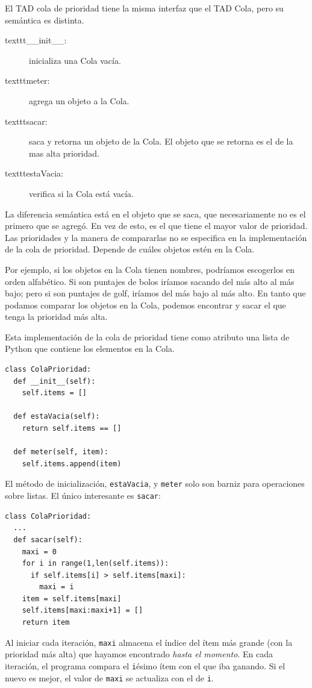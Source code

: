  

El TAD cola de prioridad tiene la misma interfaz que el TAD Cola,
pero su semántica es distinta.
\begin{description}
\item [{texttt{\_\_init\_\_}:}] inicializa una Cola vacía.
\item [{texttt{meter}:}] agrega un objeto a la Cola.
\item [{texttt{sacar}:}] saca y retorna un objeto de la Cola. El objeto
que se retorna es el de la mas alta prioridad.
\item [{texttt{estaVacia}:}] verifica si la Cola está vacía.
\end{description}
La diferencia semántica está en el objeto que se saca, que necesariamente
no es el primero que se agregó. En vez de esto, es el que tiene el
mayor valor de prioridad. Las prioridades y la manera de compararlas
no se especifica en la implementación de la cola de prioridad. Depende
de cuáles objetos estén en la Cola.

Por ejemplo, si los objetos en la Cola tienen nombres, podríamos escogerlos
en orden alfabético. Si son puntajes de bolos iríamos sacando del
más alto al más bajo; pero si son puntajes de golf, iríamos del más
bajo al más alto. En tanto que podamos comparar los objetos en la
Cola, podemos encontrar y sacar el que tenga la prioridad más alta.

Esta implementación de la cola de prioridad tiene como atributo una
lista de Python que contiene los elementos en la Cola.

\beforeverb 
\begin{verbatim}
class ColaPrioridad:
  def __init__(self):
    self.items = []

  def estaVacia(self):
    return self.items == []

  def meter(self, item):
    self.items.append(item)
\end{verbatim}
\afterverb El método de inicialización, \texttt{estaVacia}, y \texttt{meter}
solo son barniz para operaciones sobre listas. El único interesante
es \texttt{sacar}:

\beforeverb 
\begin{verbatim}
class ColaPrioridad:
  ...
  def sacar(self):
    maxi = 0
    for i in range(1,len(self.items)):
      if self.items[i] > self.items[maxi]:
        maxi = i
    item = self.items[maxi]
    self.items[maxi:maxi+1] = []
    return item
\end{verbatim}
\afterverb Al iniciar cada iteración, \texttt{maxi} almacena el índice
del ítem más grande (con la prioridad más alta) que hayamos encontrado
{\em hasta el momento}. En cada iteración, el programa compara
el \texttt{i}ésimo ítem con el que iba ganando. Si el nuevo es mejor,
el valor de \texttt{maxi} se actualiza con el de \texttt{i}.

